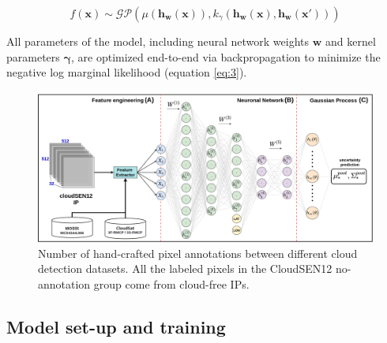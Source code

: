 \documentclass[a4paper, nobind]{templates/cdethesis}
\begin{document}
\begin{equation}
f(\mathbf{x}) \sim \mathcal{GP}(
    \mu(\mathbf{h_w(x)}),
    k_{\gamma}(\mathbf{h_w(x)}, \mathbf{h_w({x}')})
)
\end{equation}

All parameters of the model, including neural network weights \(\mathbf{w}\) and kernel parameters \(\mathbf{\gamma}\), are optimized end-to-end via backpropagation to minimize the
negative log marginal likelihood (equation \ref{eq:3}).

\begin{figure}[!h]
    \centering
    \includegraphics[width=1\linewidth]{figures/chapter02/figure02.png}
    \caption{Number of hand-crafted pixel annotations between different cloud detection datasets. All the labeled pixels in the CloudSEN12 no-annotation group come from cloud-free IPs.}
    \label{fig:figure02}
\end{figure}

\hypertarget{model-set-up-and-training}{%
\subsection{Model set-up and training}\label{model-set-up-and-training}}
\end{document}
